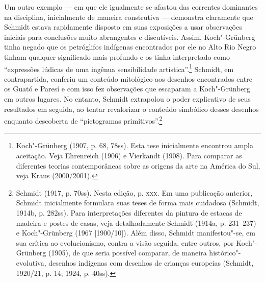 Um outro exemplo --- em que ele igualmente se afastou das correntes
dominantes na disciplina, inicialmente de maneira construtiva ---
demonstra claramente que Schmidt estava rapidamente disposto em suas
exposições a usar observações iniciais para conclusões muito abrangentes
e discutíveis. Assim, Koch"-Grünberg tinha negado que os petróglifos
indígenas encontrados por ele no Alto Rio Negro tinham qualquer
significado mais profundo e os tinha interpretado como ``expressões
lúdicas de uma ingênua sensibilidade artística''.\footnote{Koch"-Grünberg
  (1907, p. 68, 78ss). Esta tese inicialmente encontrou ampla aceitação.
  Veja Ehrenreich (1906) e Vierkandt (1908). Para comparar as
  diferentes teorias contemporâneas sobre as origens da arte na América
  do Sul, veja Kraus (2000/2001).} Schmidt, em contrapartida, conferiu
um conteúdo mitológico aos desenhos encontrados entre os Guató e Paresí
e com isso fez observações que escaparam a Koch"-Grünberg em outros
lugares. No entanto, Schmidt extrapolou o poder explicativo de seus
resultados em seguida, ao tentar revalorizar o conteúdo simbólico
desses desenhos enquanto descoberta de ``pictogramas
primitivos''.\footnote{Schmidt (1917, p. 70ss). Nesta edição, p. \textsc{xxx}.
  Em uma publicação anterior, Schmidt inicialmente formulara suas teses
  de forma mais cuidadosa (Schmidt, 1914b, p. 282ss). Para
  interpretações diferentes da pintura de estacas de madeira e postes de
  casas, veja detalhadamente Schmidt (1914a, p. 231--237) e Koch"-Grünberg
  (1967 {[}1900/10{]}). Além disso, Schmidt manifestou"-se, em sua
  crítica ao evolucionismo, contra a visão seguida, entre outros, por
  Koch"-Grünberg (1905), de que seria possível comparar, de maneira
  histórico"-evolutiva, desenhos indígenas com desenhos de crianças
  europeias (Schmidt, 1920/21, p. 14; 1924, p. 40ss).}

\asterisc

